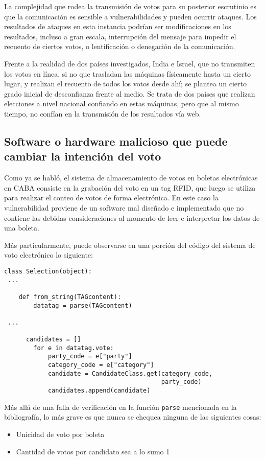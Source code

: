 La complejidad que rodea la transmisión de votos para su posterior escrutinio es que la comunicación es sensible a vulnerabilidades y pueden ocurrir ataques. Los resultados de ataques en esta instancia podrían ser modificaciones en los resultados, incluso a gran escala, interrupción del mensaje para impedir el recuento de ciertos votos, o lentificación o denegación de la comunicación.

Frente a la realidad de dos países investigados, India e Israel, que no transmiten los votos en línea, si no que trasladan las máquinas físicamente hasta un cierto lugar, y realizan el recuento de todos los votos desde ahí; se plantea un cierto grado inicial de desconfianza frente al medio. Se trata de dos países que realizan elecciones a nivel nacional confiando en estas máquinas, pero que al mismo tiempo, no confían en la transmisión de los resultados vía web.

\subsection{Software o hardware malicioso que puede cambiar la intención del voto}
Como ya se habló, el sistema de almacenamiento de votos en boletas electrónicas en CABA consiste en la grabación del voto en un tag RFID, que luego se utiliza para realizar el conteo de votos de forma electrónica. En este caso la vulnerabilidad proviene de un software mal diseñado e implementado que no contiene las debidas consideraciones al momento de leer e interpretar los datos de una boleta.

Más particularmente, puede observarse en una porción del código del sistema de voto electrónico lo siguiente:

\begin{lstlisting}
class Selection(object):
 ...

    def from_string(TAGcontent):
        datatag = parse(TAGcontent)

 ...

      candidates = []
        for e in datatag.vote:
            party_code = e["party"]
            category_code = e["category"]
            candidate = CandidateClass.get(category_code,
                                           party_code)
            candidates.append(candidate)

\end{lstlisting}

Más allá de una falla de verificación en la función \texttt{parse} mencionada en la bibliografía, lo más grave es que nunca se chequea ninguna de las siguientes cosas\cite{multivoto}:
\begin{itemize}
	\item Unicidad de voto por boleta
	\item Cantidad de votos por candidato sea a lo sumo 1
\end{itemize}

